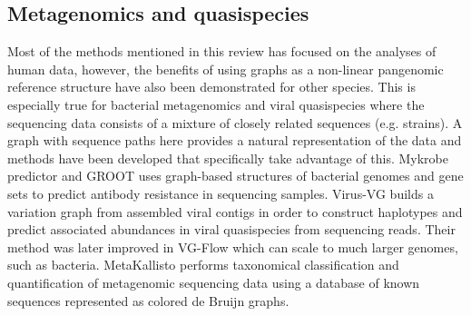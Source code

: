 \subsection{Metagenomics and quasispecies}
Most of the methods mentioned in this review has focused on the analyses of human data, however, the benefits of using graphs as a non-linear pangenomic reference structure have also been demonstrated for other species.
This is especially true for bacterial metagenomics and viral quasispecies where the sequencing data consists of a mixture of closely related sequences (e.g. strains).
A graph with sequence paths here provides a natural representation of the data and methods have been developed that specifically take advantage of this. 
Mykrobe predictor \cite{Bradley2015-kl} and GROOT \cite{Rowe2018-bg} uses graph-based structures of bacterial genomes and gene sets to predict antibody resistance in sequencing samples.
Virus-VG \cite{Baaijens2019-ng} builds a variation graph from assembled viral contigs in order to construct haplotypes and predict associated abundances in viral quasispecies from sequencing reads.
Their method was later improved in VG-Flow \cite{Baaijens2019-ha} which can scale to much larger genomes, such as bacteria.  
MetaKallisto \cite{Schaeffer2017-fh} performs taxonomical classification and quantification of metagenomic sequencing data using a database of known sequences represented as colored de Bruijn graphs.


